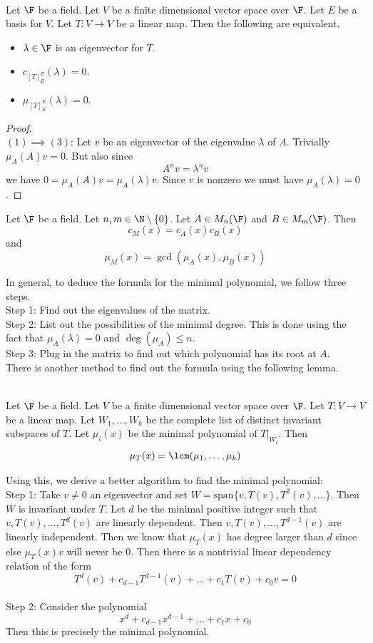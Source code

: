 \documentclass[a4paper]{article}
\begin{document}
\begin{prp}{}{}\\
Let $\F$ be a field. Let $V$ be a finite dimensional vector space over $\F$. Let $E$ be a basis for $V$. Let $T:V\to V$ be a linear map. Then the following are equivalent. 
\begin{itemize}
\item $\lambda\in\F$ is an eigenvector for $T$. 
\item $c_{[T]_E^E}(\lambda)=0$. 
\item $\mu_{[T]_E^E}(\lambda)=0$. 
\end{itemize}
\begin{proof}\\
$(1)\implies(3)$: Let $v$ be an eigenvector of the eigenvalue $\lambda$ of $A$. Trivially $\mu_A(A)v=0$. But also since $$A^nv=\lambda^nv$$ we have $0=\mu_A(A)v=\mu_A(\lambda)v$. Since $v$ is nonzero we must have $\mu_A(\lambda)=0$. 
\end{proof}
\end{prp}

\begin{lmm}{}{} Let $\F$ be a field. Let $n,m\in\N\setminus\{0\}$. Let $A\in M_n(\F)$ and $B\in M_m(\F)$. Then $$c_M(x)=c_A(x)c_B(x)$$ and $$\mu_M(x)=\gcd(\mu_A(x),\mu_B(x))$$
\end{lmm}

In general, to deduce the formula for the minimal polynomial, we follow three steps. \\
Step 1: Find out the eigenvalues of the matrix. \\
Step 2: List out the possibilities of the minimal degree. This is done using the fact that $\mu_A(\lambda)=0$ and $\deg(\mu_A)\leq n$. \\
Step 3: Plug in the matrix to find out which polynomial has its root at $A$. \\
There is another method to find out the formula using the following lemma. 

\begin{lmm}{}{}\\
Let $\F$ be a field. Let $V$ be a finite dimensional vector space over $\F$. Let $T:V\to V$ be a linear map. Let $W_1,\dots,W_k$ be the complete list of distinct invariant subspaces of $T$. Let $\mu_i(x)$ be the minimal polynomial of $T|_{W_i}$. Then $$\mu_T(x)=\lcm(\mu_1,\dots,\mu_k)$$
\end{lmm}

Using this, we derive a better algorithm to find the minimal polynomial: \\
Step 1: Take $v\neq 0$ an eigenvector and set $W=\text{span}\{v,T(v),T^2(v),\dots\}$. Then $W$ is invariant under $T$. Let $d$ be the minimal positive integer such that $v,T(v),\dots,T^d(v)$ are linearly dependent. Then $v,T(v),\dots,T^{d-1}(v)$ are linearly independent. Then we know that $\mu_T(x)$ has degree larger than $d$ since else $\mu_T(x)v$ will never be $0$. Then there is a nontrivial linear dependency relation of the form $$T^d(v)+c_{d-1}T^{d-1}(v)+\dots+c_1T(v)+c_0v=0$$\\
Step 2: Consider the polynomial $$x^d+c_{d-1}x^{d-1}+\dots+c_1x+c_0$$ Then this is precisely the minimal polynomial. 
\end{document}
